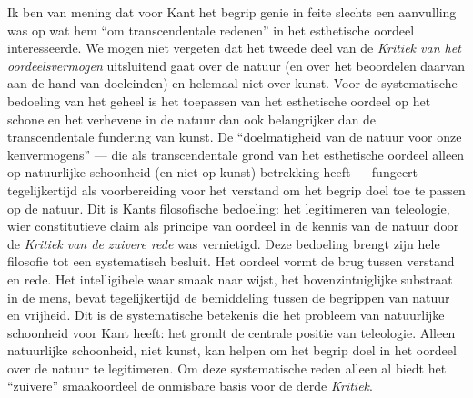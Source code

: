 Ik ben van mening dat voor Kant het begrip genie in feite slechts een aanvulling was op wat hem ``om transcendentale redenen'' in het esthetische oordeel interesseerde. We mogen niet vergeten dat het tweede deel van de \textit{Kritiek van het oordeelsvermogen} uitsluitend gaat over de natuur (en over het beoordelen daarvan aan de hand van doeleinden) en helemaal niet over kunst. Voor de systematische bedoeling van het geheel is het toepassen van het esthetische oordeel op het schone en het verhevene in de natuur dan ook belangrijker dan de transcendentale fundering van kunst. De ``doelmatigheid van de natuur voor onze kenvermogens'' — die als transcendentale grond van het esthetische oordeel alleen op natuurlijke schoonheid (en niet op kunst) betrekking heeft — fungeert tegelijkertijd als voorbereiding voor het verstand om het begrip doel toe te passen op de natuur. Dit is Kants filosofische bedoeling: het legitimeren van teleologie, wier constitutieve claim als principe van oordeel in de kennis van de natuur door de \textit{Kritiek van de zuivere rede} was vernietigd. Deze bedoeling brengt zijn hele filosofie tot een systematisch besluit. Het oordeel vormt de brug tussen verstand en rede. Het intelligibele waar smaak naar wijst, het bovenzintuiglijke substraat in de mens, bevat tegelijkertijd de bemiddeling tussen de begrippen van natuur en vrijheid. Dit is de systematische betekenis die het probleem van natuurlijke schoonheid voor Kant heeft: het grondt de centrale positie van teleologie. Alleen natuurlijke schoonheid, niet kunst, kan helpen om het begrip doel in het oordeel over de natuur te legitimeren. Om deze systematische reden alleen al biedt het ``zuivere'' smaakoordeel de onmisbare basis voor de derde \textit{Kritiek}.

